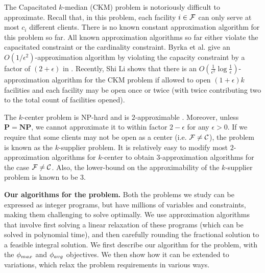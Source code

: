 The Capacitated $k$-median (CKM) problem is notoriously difficult to approximate. Recall that, in this problem, each facility $i \in \mathcal{F}$ can only serve at most $c_i$ different clients. There is no known constant approximation algorithm for this problem so far. All known approximation algorithms so far either violate the capacitated constraint or the cardinality constraint. Byrka et al. give an $O(1/\epsilon^2)$-approximation algorithm by violating the capacity constraint by a factor of $(2+\epsilon)$ in \cite{byrka_ckm}. Recently, Shi Li \cite{li_ckm} shows that there is an $O\left(\frac{1}{\epsilon^2} \log \frac{1}{\epsilon} \right) $-approximation algorithm for the CKM problem if allowed to open $(1+\epsilon)k$ facilities and each facility may be 
open once or twice (with twice contributing two to the total count of facilities opened).

The $k$-center problem is NP-hard and is $2$-approximable \cite{book:ws}. Moreover, unless $\mathbf{P} = \mathbf{NP}$, we cannot approximate it to within factor $2-\epsilon$ for any $\epsilon>0$. If we require that some clients may not be open as a center (i.e. $\mathcal{F} \neq \mathcal{C}$), the problem is known as the $k$-supplier problem. It is relatively easy to modify most $2$-approximation algorithms for $k$-center to obtain $3$-approximation algorithms for the case $\mathcal{F} \neq \mathcal{C}$. Also, the lower-bound 
on the approximability of the $k$-supplier problem is known to be $3$.

\noindent
\textbf{Our algorithms for the \probstatic{} problem.}
Both the problems we study can be expressed as integer programs, but have millions of variables and
constraints, making them challenging to solve optimally.
We use approximation algorithms that involve first solving a linear relaxation of these programs
(which can be solved in polynomial time), and then carefully rounding the fractional solution 
to a feasible integral solution. We first describe our algorithm for the \probstatic{} problem,
with the $\phi_{max}$ and $\phi_{avg}$ objectives. We then show how it can be extended to variations,
which relax the problem requirements in various ways.


